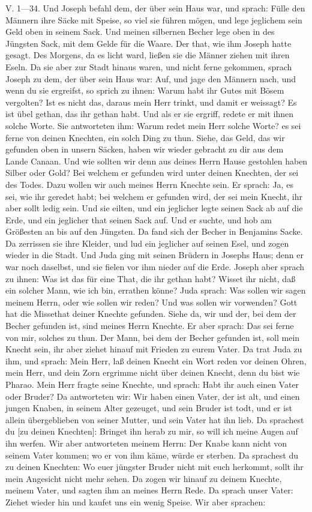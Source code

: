 V. 1—34. Und Joseph befahl dem, der über sein Haus war, und sprach: Fülle den Männern ihre Säcke mit Speise, so viel sie führen mögen, und lege jeglichem sein Geld oben in seinem Sack. Und meinen silbernen Becher lege oben in des Jüngsten Sack, mit dem Gelde für die Waare. Der that, wie ihm Joseph hatte gesagt. Des Morgens, da es licht ward, ließen sie die Männer ziehen mit ihren Eseln. Da sie aber zur Stadt hinaus waren, und nicht ferne gekommen, sprach Joseph zu dem, der über sein Haus war: Auf, und jage den Männern nach, und wenn du sie ergreifst, so sprich zu ihnen: Warum habt ihr Gutes mit Bösem vergolten? Ist es nicht das, daraus mein Herr trinkt, und damit er weissagt? Es ist übel gethan, das ihr gethan habt. Und als er sie ergriff, redete er mit ihnen solche Worte. Sie antworteten ihm: Warum redet mein Herr solche Worte? es sei ferne von deinen Knechten, ein solch Ding zu thun. Siehe, das Geld, das wir gefunden oben in unsern Säcken, haben wir wieder gebracht zu dir aus dem Lande Canaan. Und wie sollten wir denn aus deines Herrn Hause gestohlen haben Silber oder Gold? Bei welchem er gefunden wird unter deinen Knechten, der sei des Todes. Dazu wollen wir auch meines Herrn Knechte sein. Er sprach: Ja, es sei, wie ihr geredet habt; bei welchem er gefunden wird, der sei mein Knecht, ihr aber sollt ledig sein. Und sie eilten, und ein jeglicher legte seinen Sack ab auf die Erde, und ein jeglicher that seinen Sack auf. Und er suchte, und hob am Größesten an bis auf den Jüngsten. Da fand sich der Becher in Benjamins Sacke. Da zerrissen sie ihre Kleider, und lud ein jeglicher auf seinen Esel, und zogen wieder in die Stadt. Und Juda ging mit seinen Brüdern in Josephs Haus; denn er war noch daselbst, und sie fielen vor ihm nieder auf die Erde. Joseph aber sprach zu ihnen: Was ist das für eine That, die ihr gethan habt? Wisset ihr nicht, daß ein solcher Mann, wie ich bin, errathen könne? Juda sprach: Was sollen wir sagen meinem Herrn, oder wie sollen wir reden? Und was sollen wir vorwenden? Gott hat die Missethat deiner Knechte gefunden. Siehe da, wir und der, bei dem der Becher gefunden ist, sind meines Herrn Knechte. Er aber sprach: Das sei ferne von mir, solches zu thun. Der Mann, bei dem der Becher gefunden ist, soll mein Knecht sein, ihr aber ziehet hinauf mit Frieden zu eurem Vater. Da trat Juda zu ihm, und sprach: Mein Herr, laß deinen Knecht ein Wort reden vor deinen Ohren, mein Herr, und dein Zorn ergrimme nicht über deinen Knecht, denn du bist wie Pharao. Mein Herr fragte seine Knechte, und sprach: Habt ihr auch einen Vater oder Bruder? Da antworteten wir: Wir haben einen Vater, der ist alt, und einen jungen Knaben, in seinem Alter gezeuget, und sein Bruder ist todt, und er ist allein übergeblieben von seiner Mutter, und sein Vater hat ihn lieb. Da sprachest du [zu deinen Knechten]: Bringet ihn herab zu mir, so will ich meine Augen auf ihn werfen. Wir aber antworteten meinem Herrn: Der Knabe kann nicht von seinem Vater kommen; wo er von ihm käme, würde er sterben. Da sprachest du zu deinen Knechten: Wo euer jüngster Bruder nicht mit euch herkommt, sollt ihr mein Angesicht nicht mehr sehen. Da zogen wir hinauf zu deinem Knechte, meinem Vater, und sagten ihm an meines Herrn Rede. Da sprach unser Vater: Ziehet wieder hin und kaufet uns ein wenig Speise. Wir aber sprachen: 